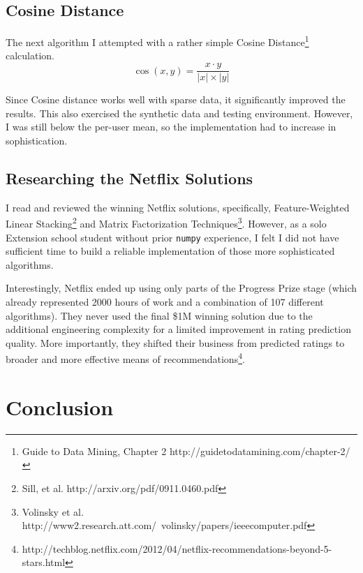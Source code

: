 \documentclass[11pt, oneside]{article}   	%
\begin{document}
\subsection*{Cosine Distance}

The next algorithm I attempted with a rather simple Cosine Distance\footnote{Guide to Data Mining, Chapter 2 http://guidetodatamining.com/chapter-2/}
calculation.
\begin{equation}
\cos(x,y) = \frac{x\cdot y}{|x|\times |y|}
\end{equation}

Since Cosine distance works well with sparse data, it significantly improved the results. This also exercised the synthetic data and testing environment. However, I was still below the per-user mean, so the implementation had to increase in sophistication.

\subsection*{Researching the Netflix Solutions}

I read and reviewed the winning Netflix solutions, specifically, Feature-Weighted Linear Stacking\footnote{Sill, et al. http://arxiv.org/pdf/0911.0460.pdf} and Matrix Factorization Techniques\footnote{Volinsky et al. http://www2.research.att.com/~volinsky/papers/ieeecomputer.pdf}. However, as a solo Extension school student without prior \texttt{numpy} experience, I felt I did not have sufficient time to build a reliable implementation of those more sophisticated algorithms. 

Interestingly, Netflix ended up using only parts of the Progress Prize stage (which already represented 2000 hours of work and a combination of 107 different algorithms). They never used the final \$1M winning solution due to the additional engineering complexity for a limited improvement in rating prediction quality. More importantly, they shifted their business from predicted ratings to broader and more effective means of recommendations\footnote{http://techblog.netflix.com/2012/04/netflix-recommendations-beyond-5-stars.html}.

\section*{Conclusion}
\end{document}
